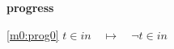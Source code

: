\textbf{progress}
\begin{block}
\item[ \eqref{m0:prog0} ]{$t \in in  \quad \mapsto\quad \neg t \in in $} %
\end{block}
